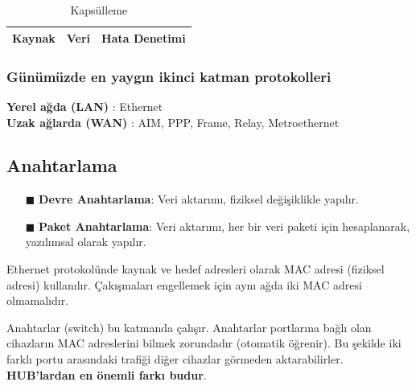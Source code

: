 \begin{table}[h]
	\centering
	\caption{Kapsülleme}
	\label{tab:table_kapsulleme}
	\begin{tabular}{|c|c|c|}
		\hline
		Kaynak & Veri & Hata Denetimi \\
		\hline
	\end{tabular}
\end{table}

\subsubsection*{Günümüzde en yaygın ikinci katman protokolleri}
\textbf{Yerel ağda (LAN)} : Ethernet \\
\textbf{Uzak ağlarda (WAN)} : AIM, PPP, Frame, Relay, Metroethernet
\subsection*{Anahtarlama}
\begin{enumerate}
	\item[$\blacksquare$] \textbf{Devre Anahtarlama}: Veri aktarımı, fiziksel değişiklikle yapılır.
	\item[$\blacksquare$] \textbf{Paket Anahtarlama}: Veri aktarımı, her bir veri paketi için hesaplanarak, yazılımsal olarak yapılır.
\end{enumerate}
Ethernet protokolünde kaynak ve hedef adresleri olarak MAC adresi (fiziksel adresi) kullanılır. Çakışmaları engellemek için aynı ağda iki MAC adresi olmamalıdır.

Anahtarlar (switch) bu katmanda çalışır.
Anahtarlar portlarına bağlı olan cihazların MAC adreslerini bilmek zorundadır (otomatik öğrenir).
Bu şekilde iki farklı portu arasındaki trafiği diğer cihazlar görmeden aktarabilirler. \textbf{HUB'lardan en önemli farkı budur}.

